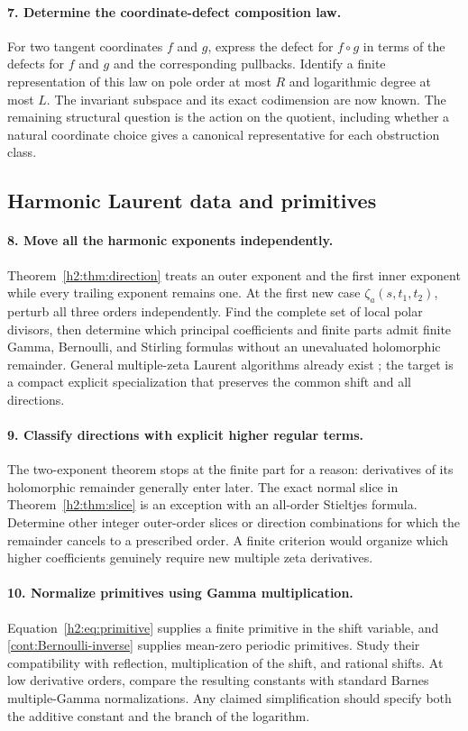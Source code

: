 \paragraph{7. Determine the coordinate-defect composition law.}
For two tangent coordinates $f$ and $g$, express the defect for
$f\circ g$ in terms of the defects for $f$ and $g$ and the
corresponding pullbacks. Identify a finite representation of this
law on pole order at most $R$ and logarithmic degree at most $L$.
The invariant subspace and its exact codimension are now known.
The remaining structural question is the action on the quotient,
including whether a natural coordinate choice gives a canonical
representative for each obstruction class.

\subsection{Harmonic Laurent data and primitives}

\paragraph{8. Move all the harmonic exponents independently.}
Theorem~\ref{h2:thm:direction} treats an outer exponent and the first
inner exponent while every trailing exponent remains one.
At the first new case
$\zeta_a(s,t_1,t_2)$, perturb all three orders independently.
Find the complete set of local polar divisors, then determine which
principal coefficients and finite parts admit finite Gamma,
Bernoulli, and Stirling formulas without an unevaluated
holomorphic remainder. General multiple-zeta Laurent algorithms
already exist \cite{h2:MOW}; the target is a compact explicit
specialization that preserves the common shift and all directions.

\paragraph{9. Classify directions with explicit higher regular terms.}
The two-exponent theorem stops at the finite part for a reason:
derivatives of its holomorphic remainder generally enter later.
The exact normal slice in Theorem~\ref{h2:thm:slice} is an exception
with an all-order Stieltjes formula. Determine other integer
outer-order slices or direction combinations for which the
remainder cancels to a prescribed order. A finite criterion would
organize which higher coefficients genuinely require new multiple
zeta derivatives.

\paragraph{10. Normalize primitives using Gamma multiplication.}
Equation~\eqref{h2:eq:primitive} supplies a finite primitive in the
shift variable, and \eqref{cont:Bernoulli-inverse} supplies
mean-zero periodic primitives. Study their compatibility with
reflection, multiplication of the shift, and rational shifts.
At low derivative orders, compare the resulting constants with
standard Barnes multiple-Gamma normalizations. Any claimed
simplification should specify both the additive constant and the
branch of the logarithm.

